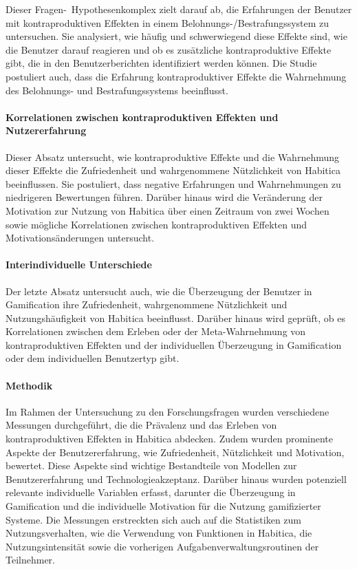 \documentclass[sigconf, nonacm]{acmart}
\begin{document}
Dieser Fragen-\ Hypothesenkomplex zielt darauf ab, die Erfahrungen der Benutzer mit kontraproduktiven Effekten in einem Belohnungs-/Bestrafungssystem zu untersuchen. Sie analysiert, wie häufig und schwerwiegend diese Effekte sind, wie die Benutzer darauf reagieren und ob es zusätzliche kontraproduktive Effekte gibt, die in den Benutzerberichten identifiziert werden können. Die Studie postuliert auch, dass die Erfahrung kontraproduktiver Effekte die Wahrnehmung des Belohnungs- und Bestrafungssystems beeinflusst.

\paragraph{Korrelationen zwischen kontraproduktiven Effekten und Nutzererfahrung}

Dieser Absatz untersucht, wie kontraproduktive Effekte und die Wahrnehmung dieser Effekte die Zufriedenheit und wahrgenommene Nützlichkeit von Habitica beeinflussen. Sie postuliert, dass negative Erfahrungen und Wahrnehmungen zu niedrigeren Bewertungen führen. Darüber hinaus wird die Veränderung der Motivation zur Nutzung von Habitica über einen Zeitraum von zwei Wochen sowie mögliche Korrelationen zwischen kontraproduktiven Effekten und Motivationsänderungen untersucht.

\paragraph{Interindividuelle Unterschiede}

Der letzte Absatz untersucht auch, wie die Überzeugung der Benutzer in Gamification ihre Zufriedenheit, wahrgenommene Nützlichkeit und Nutzungshäufigkeit von Habitica beeinflusst. Darüber hinaus wird geprüft, ob es Korrelationen zwischen dem Erleben oder der Meta-Wahrnehmung von kontraproduktiven Effekten und der individuellen Überzeugung in Gamification oder dem individuellen Benutzertyp gibt.

\paragraph{Methodik}
Im Rahmen der Untersuchung zu den Forschungsfragen wurden verschiedene Messungen durchgeführt, die die Prävalenz und das Erleben von kontraproduktiven Effekten in Habitica abdecken. Zudem wurden prominente Aspekte der Benutzererfahrung, wie Zufriedenheit, Nützlichkeit und Motivation, bewertet. Diese Aspekte sind wichtige Bestandteile von Modellen zur Benutzererfahrung und Technologieakzeptanz.
Darüber hinaus wurden potenziell relevante individuelle Variablen erfasst, darunter die Überzeugung in Gamification und die individuelle Motivation für die Nutzung gamifizierter Systeme. Die Messungen erstreckten sich auch auf die Statistiken zum Nutzungsverhalten, wie die Verwendung von Funktionen in Habitica, die Nutzungsintensität sowie die vorherigen Aufgabenverwaltungsroutinen der Teilnehmer.
\end{document}
